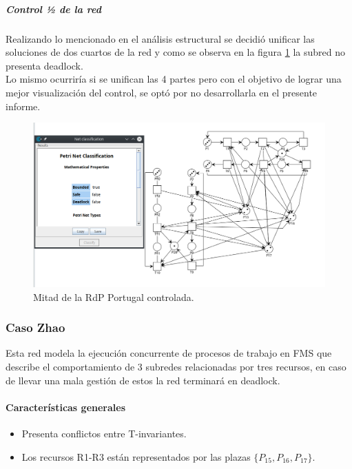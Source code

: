 \subparagraph{Control ½ de la red}
\hfill \break
Realizando lo mencionado en el análisis estructural se decidió unificar las soluciones de dos cuartos de la red y como se observa en la figura \ref{fig:mitadred_portugalcontrolada} la subred no presenta deadlock.\\
Lo mismo ocurriría si se unifican las 4 partes pero con el objetivo de lograr una mejor visualización del control,  se optó por no desarrollarla en el presente informe.

\begin{figure}[H]
	\centering
	\includegraphics[scale=0.45]{Figures/algoritmo3/Portugal4.png}
	\caption{Mitad de la RdP Portugal controlada.}
	\label{fig:mitadred_portugalcontrolada}
 \end{figure}
\bigskip

\subsubsection{Caso Zhao}
Esta red modela la ejecución concurrente de procesos de trabajo en FMS que describe el comportamiento de 3 subredes relacionadas por tres recursos, en caso de llevar una mala gestión de estos la red terminará en deadlock.

\paragraph{Características generales}
\begin{itemize}
    \item Presenta conflictos entre T-invariantes.
    \item Los recursos R1-R3 están representados por las plazas $\{P_{15}, P_{16}, P_{17}\}$. \\
\end{itemize}
\bigskip

